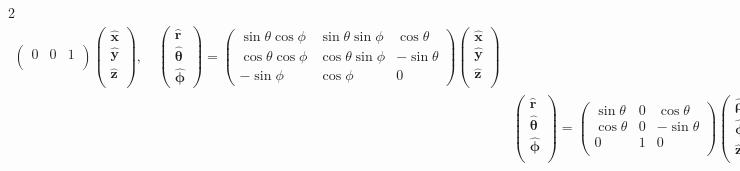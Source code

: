 \documentclass[10pt]{article}
\newcommand{\rhat}{\boldsymbol{\hat{\textbf{r}}}}
\newcommand{\xhat}{\boldsymbol{\hat{\textbf{x}}}}
\newcommand{\yhat}{\boldsymbol{\hat{\textbf{y}}}}
\newcommand{\zhat}{\boldsymbol{\hat{\textbf{z}}}}
\newcommand{\phihat}{\boldsymbol{\hat{\textbf{$\phi$}}}}
\newcommand{\thetahat}{\boldsymbol{\hat{\textbf{$\theta$}}}}
\newcommand{\rhohat}{\boldsymbol{\hat{\textbf{$\rho$}}}}
\begin{document}
\begin{multicols}{2}
\begin{align*}
\begin{pmatrix}
 			0 & 0 & 1 \\
 		\end{pmatrix} 
 		\begin{pmatrix}
 			\xhat \\
 			\yhat \\
 			\zhat \\
 		\end{pmatrix}, \quad
 		\begin{pmatrix}
			\rhat \\
			\thetahat \\
			\phihat
 		\end{pmatrix} =
 		\begin{pmatrix}
			\sin \theta \cos \phi & \sin \theta \sin \phi & \cos \theta\\
			\cos \theta \cos \phi & \cos \theta \sin \phi & - \sin \theta \\
			-\sin \phi & \cos \phi & 0
 		\end{pmatrix} 
 		\begin{pmatrix}
 			\xhat \\
 			\yhat \\
 			\zhat \\
 		\end{pmatrix} \\
 		& \begin{pmatrix}
 			\rhat \\
 			\thetahat \\
 			\phihat \\
 		\end{pmatrix} = 
 		\begin{pmatrix}
 			\sin \theta & 0 & \cos \theta \\
 			\cos \theta & 0 & -\sin \theta \\
 			0 & 1 & 0 \\
 		\end{pmatrix}
 		\begin{pmatrix}
 			\rhohat \\
 			\phihat \\
 			\zhat \\
 		\end{pmatrix}, \quad 
 		\begin{pmatrix}
			\rhohat \\
			\phihat \\
			\zhat
 		\end{pmatrix} = 
 		\begin{pmatrix}
 			\rho / \sqrt{\rho^2 + z^2} & z / \sqrt{\rho^2 + z^2} & 0 \\

\end{pmatrix}
\end{align*}
\end{multicols}
\end{document}
